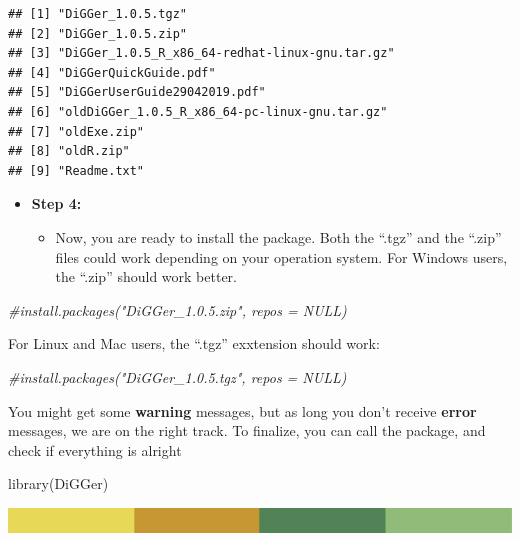 \documentclass[
]{book}
\newenvironment{Shaded}{\begin{snugshade}}{\end{snugshade}}
\newcommand{\CommentTok}[1]{\textcolor[rgb]{0.56,0.35,0.01}{\textit{#1}}}
\newcommand{\FunctionTok}[1]{\textcolor[rgb]{0.00,0.00,0.00}{#1}}
\newcommand{\NormalTok}[1]{#1}
\providecommand{\tightlist}{%
  \setlength{\itemsep}{0pt}\setlength{\parskip}{0pt}}
\begin{document}
\begin{verbatim}
## [1] "DiGGer_1.0.5.tgz"                             
## [2] "DiGGer_1.0.5.zip"                             
## [3] "DiGGer_1.0.5_R_x86_64-redhat-linux-gnu.tar.gz"
## [4] "DiGGerQuickGuide.pdf"                         
## [5] "DiGGerUserGuide29042019.pdf"                  
## [6] "oldDiGGer_1.0.5_R_x86_64-pc-linux-gnu.tar.gz" 
## [7] "oldExe.zip"                                   
## [8] "oldR.zip"                                     
## [9] "Readme.txt"
\end{verbatim}

\begin{itemize}
\item
  \textbf{Step 4:}

  \begin{itemize}
  \tightlist
  \item
    Now, you are ready to install the package. Both the ``.tgz'' and the ``.zip'' files could work depending on your operation system. For Windows users, the ``.zip'' should work better.
  \end{itemize}
\end{itemize}

\begin{Shaded}
\begin{Highlighting}[]
\CommentTok{\#install.packages("DiGGer\_1.0.5.zip", repos = NULL)}
\end{Highlighting}
\end{Shaded}

For Linux and Mac users, the ``.tgz'' exxtension should work:

\begin{Shaded}
\begin{Highlighting}[]
\CommentTok{\#install.packages("DiGGer\_1.0.5.tgz", repos = NULL)}
\end{Highlighting}
\end{Shaded}

You might get some \textbf{warning} messages, but as long you don't receive \textbf{error} messages, we are on the right track. To finalize, you can call the package, and check if everything is alright

\begin{Shaded}
\begin{Highlighting}[]
\FunctionTok{library}\NormalTok{(DiGGer)}
\end{Highlighting}
\end{Shaded}

\includegraphics{rsrstrip.png}
\end{document}

